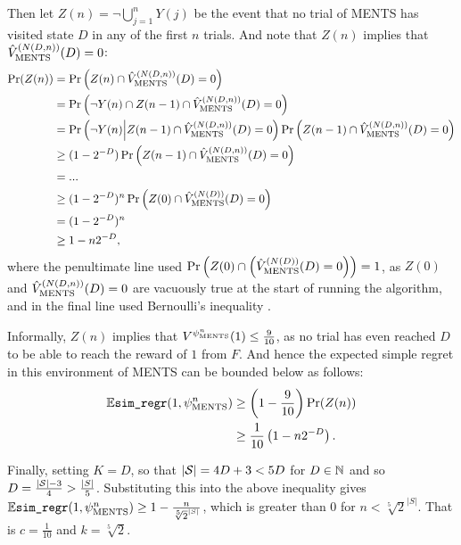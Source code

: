 \begin{proofoutline}
        Then let $Z(n)=\neg \bigcup_{j=1}^n Y(j)$ be the event that no trial of MENTS has visited state $D$ in any of the first $n$ trials. And note that $Z(n)$ implies that ${\hat{V}^{(N(D,n))}_{{\textnormal{MENTS}}}}(D)=0$: 
        \begin{align}
            \Pr(Z(n)) 
                &= \Pr\left(Z(n) \cap {\hat{V}^{(N(D,n))}_{{\textnormal{MENTS}}}}(D)=0\right) \\
                &= \Pr\left(\neg Y(n) \cap Z(n-1) \cap {\hat{V}^{(N(D,n))}_{{\textnormal{MENTS}}}}(D) = 0  \right) \\
                &= \Pr\left(\neg Y(n) \middle| Z(n-1) \cap {\hat{V}^{(N(D,n))}_{{\textnormal{MENTS}}}}(D) = 0 \right) 
                    \Pr\left( Z(n-1) \cap {\hat{V}^{(N(D,n))}_{{\textnormal{MENTS}}}}(D) = 0 \right) \\
                &\geq (1-2^{-D}) \Pr\left( Z(n-1) \cap {\hat{V}^{(N(D,n))}_{{\textnormal{MENTS}}}}(D) = 0 \right) \\
                &= ... \\
                &\geq (1-2^{-D})^n \Pr\left( Z(0) \cap {\hat{V}^{(N(D))}_{{\textnormal{MENTS}}}}(D)=0\right) \\
                &= (1-2^{-D})^n \\
                &\geq 1-n2^{-D},
        \end{align}
        where the penultimate line used $\Pr\left( Z(0) \cap \left({\hat{V}^{(N(D))}_{{\textnormal{MENTS}}}}(D)=0\right)\right)=1$, as $Z(0)$ and ${\hat{V}^{(N(D,n))}_{{\textnormal{MENTS}}}}(D)=0$ are vacuously true at the start of running the algorithm, and in the final line used Bernoulli's inequality .
        
        Informally, $Z(n)$ implies that $V^{\psi^{n}_{{\textnormal{MENTS}}}}(1) \leq \frac{9}{10}$, as no trial has even reached $D$ to be able to reach the reward of $1$ from $F$. And hence the expected simple regret in this environment of MENTS can be bounded below as follows:
        \begin{align}
            \mathbb{E}{\textnormal{\texttt{sim\_regr}}}(1,\psi^n_{\text{MENTS}}) 
                & \geq \left(1-\frac{9}{10}\right) \Pr(Z(n)) \\
                & \geq \frac{1}{10} \left( 1-n2^{-D} \right).
        \end{align}
        
        Finally, setting $K=D$, so that $|\mathcal{S}|=4D+3<5D$ for $D\in\mathbb{N}$  and so $D=\frac{|\mathcal{S}|-3}{4}>\frac{|S|}{5}$. Substituting this into the above inequality gives $\mathbb{E}{\textnormal{\texttt{sim\_regr}}}(1,\psi^{n}_{{\textnormal{MENTS}}}) \geq 1 - \frac{n}{\sqrt[5]{2}^{|S|}}$, which is greater than $0$ for $n < \sqrt[5]{2}^{|S|}$. That is $c=\frac{1}{10}$ and $k=\sqrt[5]{2}$.
    \end{proofoutline}


